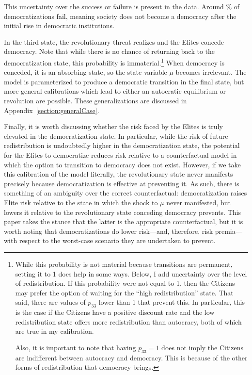 \documentclass[12pt]{article}
\numberwithin{equation}{section}
\begin{document}
This uncertainty over the success or failure is present in the data.  Around \pctDemFail\% of democratizations fail, meaning society does not become a democracy after the initial rise in democratic institutions.

In the third state, the revolutionary threat realizes and the Elites concede democracy. Note that while there is no chance of returning back to the democratization state, this probability is immaterial.\footnote{While this probability is not material because transitions are permanent, setting it to 1 does help in some ways. Below, I add uncertainty over the level of redistribution. If this probability were not equal to 1, then the Citizens may prefer the option of waiting for the ``high redistribution'' state. That said, there are values of $p_{33}$ lower than 1 that prevent this. In particular, this is the case if the Citizens have a positive discount rate and the low redistribution state offers more redistribution than autocracy, both of which are true in my calibration. \par Also, it is important to note that having $p_{33}=1$ does not imply the Citizens are indifferent between autocracy and democracy. This is because of the other forms of redistribution that democracy brings.} When democracy is conceded, it is an absorbing state, so the state variable $\mu$ becomes irrelevant. The model is parameterized to produce a democratic transition in the final state, but more general calibrations which lead to either an autocratic equilibrium or revolution are possible. These generalizations are discussed in Appendix~\ref{section:generalCase}.

\label{par:correct_counterfactual}
Finally, it is worth discussing whether the risk faced by the Elites is truly elevated in the democratization state. In particular, while the risk of future redistribution is undoubtedly higher in the democratization state, the potential for the Elites to democratize reduces risk relative to a counterfactual model in which the option to transition to democracy does not exist. However, if we take this calibration of the model literally, the revolutionary state never manifests precisely because democratization is effective at preventing it. As such, there is something of an ambiguity over the correct counterfactual: democratization raises Elite risk relative to the state in which the shock to $\mu$ never manifested, but lowers it relative to the revolutionary state conceding democracy prevents. This paper takes the stance that the latter is the appropriate counterfactual, but it is worth noting that democratizations do lower risk---and, therefore, risk premia---with respect to the worst-case scenario they are undertaken to prevent.
\end{document}
